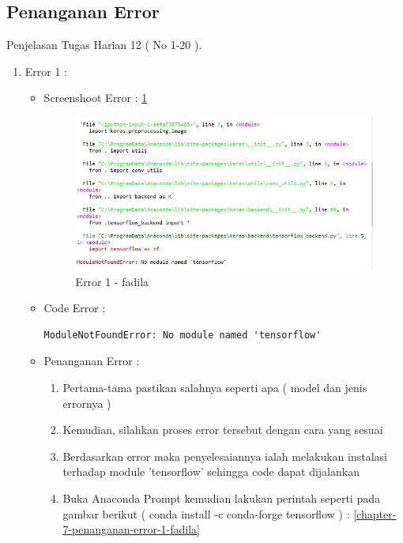 \subsection{Penanganan Error}
Penjelasan Tugas Harian 12 ( No 1-20 ).
\begin{enumerate}
\item Error 1	:
\begin{itemize}
\item Screenshoot Error 	: \ref{chapter-7-error-1-fadila}
\par
\par
\begin{figure}[!hbtp]
\centering
\includegraphics[scale=0.2]{figures/chapter-7-error-1-fadila.jpg}
\caption{Error 1 - fadila}
\label{chapter-7-error-1-fadila}
\end{figure}
\par
\item Code Error		:
\begin{lstlisting}
ModuleNotFoundError: No module named 'tensorflow'
\end{lstlisting}
\item Penanganan Error	:
\begin{enumerate}
\item Pertama-tama pastikan salahnya seperti apa ( model dan jenis errornya )
\item Kemudian, silahkan proses error tersebut dengan cara yang sesuai
\item Berdasarkan error maka penyelesaiannya ialah melakukan instalasi terhadap module 'tensorflow' sehingga code dapat dijalankan
\item Buka Anaconda Prompt kemudian lakukan perintah seperti pada gambar berikut ( conda install -c conda-forge tensorflow ) : \ref{chapter-7-penanganan-error-1-fadila}
\par
\begin{figure}[!hbtp]

\end{figure}
\end{enumerate}
\end{itemize}
\end{enumerate}
